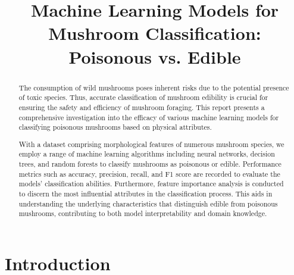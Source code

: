 \documentclass[11pt, conference]{IEEEtran}
\begin{document}
\title{Machine Learning Models for Mushroom Classification: Poisonous vs. Edible}

\author{
    \and
    \IEEEauthorblockA{}
    \and
    \IEEEauthorblockA{}
    \and
    \IEEEauthorblockA{}
}

\maketitle

\begin{abstract}
    The consumption of wild mushrooms poses inherent risks due to the potential presence of toxic species. Thus, accurate classification of mushroom edibility is crucial for ensuring the safety and efficiency of mushroom foraging. This report presents a comprehensive investigation into the efficacy of various machine learning models for classifying poisonous mushrooms based on physical attributes.
    
    With a dataset comprising morphological features of numerous mushroom species, we employ a range of machine learning algorithms including neural networks, decision trees, and random forests to classify mushrooms as poisonous or edible. Performance metrics such as accuracy, precision, recall, and F1 score are recorded to evaluate the models' classification abilities. Furthermore, feature importance analysis is conducted to discern the most influential attributes in the classification process. This aids in understanding the underlying characteristics that distinguish edible from poisonous mushrooms, contributing to both model interpretability and domain knowledge.
\end{abstract}

\section{Introduction}
\end{document}
